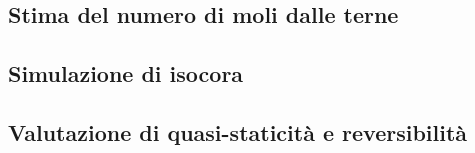 \documentclass[a4paper,11pt,oneside]{article}
\begin{document}



\subsection{Stima del numero di moli dalle terne}

\subsection{Simulazione di isocora}

\subsection{Valutazione di quasi-staticità e reversibilità}
\end{document}
